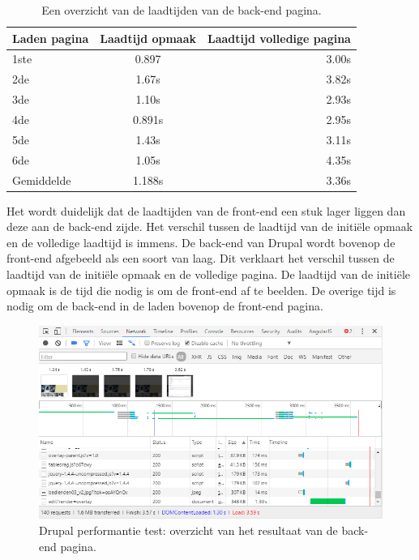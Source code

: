 \pagebreak

\begin{table}[!ht]
\centering
\begin{tabular}{|l|c|r|}
    \hline
    Laden pagina & Laadtijd opmaak & Laadtijd volledige pagina\\
    \hline
    1ste & 0.897 & 3.00s\\
    \hline
    2de & 1.67s & 3.82s\\
    \hline
    3de & 1.10s & 2.93s\\
    \hline
    4de & 0.891s & 2.95s\\
    \hline
    5de & 1.43s & 3.11s\\
     \hline
    6de & 1.05s & 4.35s\\
    \hline
    Gemiddelde & 1.188s & 3.36s\\
    \hline
\end{tabular}
\caption{\label{tab:Drupal resultaten performantie back-end } Een overzicht van de laadtijden van de back-end pagina.}
\end{table}

\noindent
Het wordt duidelijk dat de laadtijden van de front-end een stuk lager liggen dan deze aan de back-end zijde. Het verschil tussen de laadtijd van de initiële opmaak en de volledige laadtijd is immens. De back-end van Drupal wordt bovenop de front-end afgebeeld als een soort van laag. Dit verklaart het verschil tussen de laadtijd van de initiële opmaak en de volledige pagina. De laadtijd van de initiële opmaak is de tijd die nodig is om de front-end af te beelden. De overige tijd is nodig om de back-end in de laden bovenop de front-end pagina. 

\begin{figure}[!ht]
  \includegraphics[width=\textwidth]{img/dr-performance-test-backend.png}
  \caption{Drupal performantie test: overzicht van het resultaat van de back-end pagina.}
  \label{fig:Drupal performantie test back-end.}
\end{figure}


